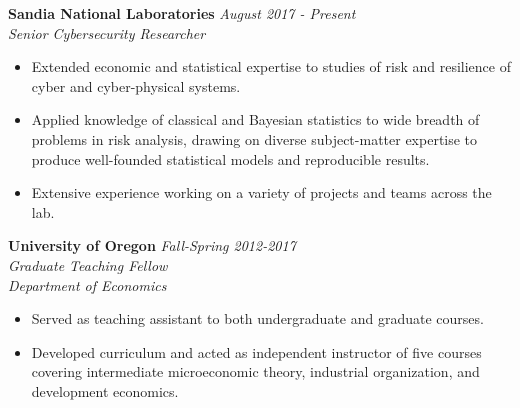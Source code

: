 \documentclass[11pt]{article}
\newenvironment{changemargin}[2]{%
  \begin{list}{}{%
    \setlength{\topsep}{0pt}%
    \setlength{\leftmargin}{#1}%
    \setlength{\rightmargin}{#2}%
    \setlength{\listparindent}{\parindent}%
    \setlength{\itemindent}{\parindent}%
    \setlength{\parsep}{\parskip}%
  }%
  \item[]}{\end{list}
}
\newenvironment{body} {
	\vspace*{-16pt}
	\begin{changemargin}{-0.25in}{-0.5in}
  }	
	{\end{changemargin}
}
\begin{document}
\begin{body}
	\vspace{14pt}
	
	\textbf{Sandia National Laboratories} \hfill \emph{August 2017 - Present}\\
	\emph{Senior Cybersecurity Researcher}\\
	\vspace*{-4pt}
	\begin{itemize}
		\item Extended economic and statistical expertise to studies of risk and resilience of cyber and cyber-physical systems.
		\item Applied knowledge of classical and Bayesian statistics to wide breadth of problems in risk analysis, drawing on diverse subject-matter expertise to produce well-founded statistical models and reproducible results.
		\item Extensive experience working on a variety of projects and teams across the lab.
	\end{itemize}	
	
	
	\textbf{University of Oregon} \hfill \emph{Fall-Spring 2012-2017}\\
	\emph{Graduate Teaching Fellow}\\
	\emph{Department of Economics}
	\vspace*{-4pt}
	\begin{itemize}
		\item Served as teaching assistant to both undergraduate and graduate courses.
		\item Developed curriculum and acted as independent instructor of five courses covering intermediate microeconomic theory, industrial organization, and development economics.
	\end{itemize}	
	


\end{body}
\end{document}
